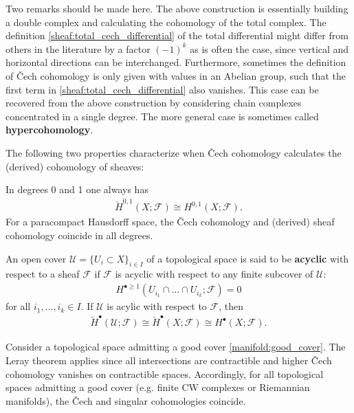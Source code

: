     \begin{remark}[Hypercohomology]
        Two remarks should be made here. The above construction is essentially building a double complex and calculating the cohomology of the total complex. The definition \eqref{sheaf:total_cech_differential} of the total differential might differ from others in the literature by a factor $(-1)^k$ as is often the case, since vertical and horizontal directions can be interchanged. Furthermore, sometimes the definition of \v{C}ech cohomology is only given with values in an Abelian group, such that the first term in \eqref{sheaf:total_cech_differential} also vanishes. This case can be recovered from the above construction by considering chain complexes concentrated in a single degree. The more general case is sometimes called \textbf{hypercohomology}.
    \end{remark}

    The following two properties characterize when \v{C}ech cohomology calculates the (derived) cohomology of sheaves:
    \begin{property}
        In degrees 0 and 1 one always has
        \begin{gather}
            \check{H}^{0,1}(X;\mathcal{F})\cong H^{0,1}(X;\mathcal{F}).
        \end{gather}
        For a paracompact Hausdorff space, the \v{C}ech cohomology and (derived) sheaf cohomology coincide in all degrees.
    \end{property}
    \begin{property}[Leray]
        An open cover $\mathcal{U}=\{U_i\subset X\}_{i\in I}$ of a topological space is said to be \textbf{acyclic} with respect to a sheaf $\mathcal{F}$ if $\mathcal{F}$ is acyclic with respect to any finite subcover of $\mathcal{U}$:
        \begin{gather}
            H^{\bullet\geq1}(U_{i_1}\cap\ldots\cap U_{i_k};\mathcal{F})=0
        \end{gather}
        for all $i_1,\ldots,i_k\in I$. If $\mathcal{U}$ is acylic with respect to $\mathcal{F}$, then
        \begin{gather}
            \check{H}^\bullet(\mathcal{U};\mathcal{F})\cong\check{H}^\bullet(X;\mathcal{F})\cong H^\bullet(X;\mathcal{F}).
        \end{gather}
    \end{property}
    \begin{example}
        Consider a topological space admitting a good cover \ref{manifold:good_cover}. The Leray theorem applies since all intersections are contractible and higher \v{C}ech cohomology vanishes on contractible spaces. Accordingly, for all topological spaces admitting a good cover (e.g. finite CW complexes or Riemannian manifolds), the \v{C}ech and singular cohomologies coincide.
    \end{example}

